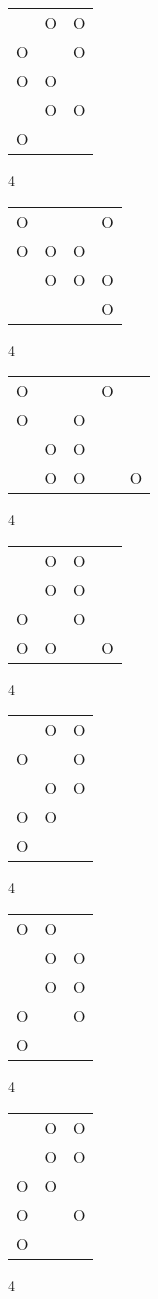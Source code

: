 \begin{tabular}{|m{0.2cm}m{0.2cm}m{0.2cm}|}\hline
 &O&O\\
O& &O\\
O&O& \\
 &O&O\\
O& & \\
\hline\end{tabular}4
\begin{tabular}{|m{0.2cm}m{0.2cm}m{0.2cm}m{0.2cm}|}\hline
O& & &O\\
O&O&O& \\
 &O&O&O\\
 & & &O\\
\hline\end{tabular}4
\begin{tabular}{|m{0.2cm}m{0.2cm}m{0.2cm}m{0.2cm}m{0.2cm}|}\hline
O& & &O& \\
O& &O& & \\
 &O&O& & \\
 &O&O& &O\\
\hline\end{tabular}4
\begin{tabular}{|m{0.2cm}m{0.2cm}m{0.2cm}m{0.2cm}|}\hline
 &O&O& \\
 &O&O& \\
O& &O& \\
O&O& &O\\
\hline\end{tabular}4
\begin{tabular}{|m{0.2cm}m{0.2cm}m{0.2cm}|}\hline
 &O&O\\
O& &O\\
 &O&O\\
O&O& \\
O& & \\
\hline\end{tabular}4
\begin{tabular}{|m{0.2cm}m{0.2cm}m{0.2cm}|}\hline
O&O& \\
 &O&O\\
 &O&O\\
O& &O\\
O& & \\
\hline\end{tabular}4
\begin{tabular}{|m{0.2cm}m{0.2cm}m{0.2cm}|}\hline
 &O&O\\
 &O&O\\
O&O& \\
O& &O\\
O& & \\
\hline\end{tabular}4
